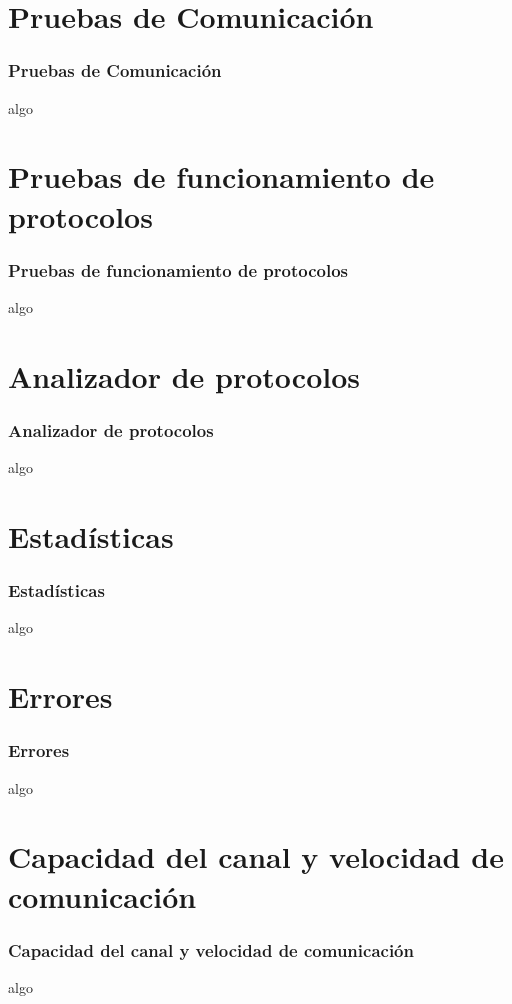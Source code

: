 \section{Pruebas de Comunicaci\'on}
  \begin{frame}
    \frametitle{Pruebas de Comunicaci\'on}
    algo
  \end{frame}
\section{Pruebas de funcionamiento de protocolos}
  \begin{frame}
    \frametitle{Pruebas de funcionamiento de protocolos}
    algo
  \end{frame}
\section{Analizador de protocolos}
  \begin{frame}
    \frametitle{Analizador de protocolos}
    algo
  \end{frame}
\section{Estad\'isticas}
  \begin{frame}
    \frametitle{Estad\'isticas}
    algo
  \end{frame}
\section{Errores}
  \begin{frame}
    \frametitle{Errores}
    algo
  \end{frame}
\section{Capacidad del canal y velocidad de comunicaci\'on}
  \begin{frame}
    \frametitle{Capacidad del canal y velocidad de comunicaci\'on}
    algo
  \end{frame}
